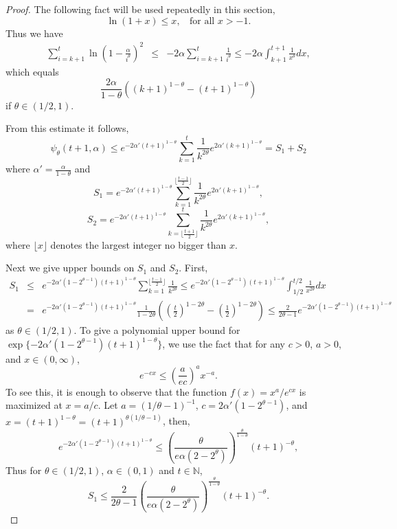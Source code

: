 \documentclass[twoside]{amsart}
\theoremstyle{theorem}
\theoremstyle{definition}
\theoremstyle{remark}
\def\N{{\mathbb N}}
\newcommand{\DS}{\displaystyle}
\begin{document}
\begin{proof}
The following fact will be used repeatedly in this section,
\begin{equation}\label{eq:logubd}
\ln (1+x) \leq x, \ \ \ \ \mbox{for all $x>-1$}.
\end{equation}
Thus we have
\begin{eqnarray*}
\sum_{i=k+1}^t \ln \left( 1-\frac{\alpha}{i^\theta} \right)^2 & \leq &
-2\alpha \sum_{i=k+1}^t \frac{1}{i^\theta} \leq -2\alpha \int_{k+1}^{t+1} \frac{1}{x^\theta} d x,
\end{eqnarray*}
which equals
\[ \frac{2\alpha}{1-\theta} \left((k+1)^{1-\theta}-(t+1)^{1-\theta} \right) \]
if $\theta\in (1/2,1)$.

From this estimate it follows,
\[ \psi_\theta(t+1,\alpha) \leq e^{-2\alpha'(t+1)^{1-\theta}} \sum_{k=1}^{t} \frac{1}{k^{2\theta}}
e^{2\alpha'(k+1)^{1-\theta}} = S_1 + S_2 \]
where $\DS \alpha'=\frac{\alpha}{1-\theta}$ and
\[ S_1 = e^{-2\alpha'(t+1)^{1-\theta}} \sum_{k=1}^{\lfloor\frac{t-1}{2}\rfloor} \frac{1}{k^{2\theta}} e^{2\alpha'(k+1)^{1-\theta}},\]
\[ S_2 = e^{-2\alpha'(t+1)^{1-\theta}} \sum_{k=\lfloor\frac{t+1}{2}\rfloor}^{t} \frac{1}{k^{2\theta}} e^{2\alpha'(k+1)^{1-\theta}},\]
where $\lfloor x \rfloor$ denotes the largest integer no bigger than $x$.

Next we give upper bounds on $S_1$ and $S_2$. First,
\begin{eqnarray*}
S_1 & \leq & e^{-2 \alpha' (1-2^{\theta-1}) (t+1)^{1-\theta}} \sum_{k=1}^{\lfloor\frac{t-1}{2}\rfloor} \frac{1}{k^{2\theta}}
\leq e^{-2 \alpha' (1-2^{\theta-1}) (t+1)^{1-\theta}} \int_{1/2}^{t/2} \frac{1}{x^{2\theta}} d x \\
& = &  e^{-2 \alpha' (1-2^{\theta-1}) (t+1)^{1-\theta} }\frac{1}{1-2\theta} \left(\left(\frac{t}{2}\right)^{1-2\theta}- \left(\frac{1}{2}\right)^{1-2\theta}\right)
\leq  \frac{2}{2 \theta-1} e^{-2 \alpha' (1-2^{\theta-1}) (t+1)^{1-\theta}}
\end{eqnarray*}
as $\theta\in (1/2,1)$. To give a polynomial upper bound for $\exp\{-2 \alpha' (1-2^{\theta-1}) (t+1)^{1-\theta}\}$, we use
the fact that for
any $c>0$, $a>0$, and $x\in (0,\infty)$,
\[ e^{-cx} \leq \left(\frac{a}{ec}\right)^a x^{-a}. \]
To see this, it is enough to observe that the function $f(x)=x^a / e^{cx}$ is maximized at $x=a/c$.
Let $a=(1/\theta-1)^{-1}$, $c= 2 \alpha' (1-2^{\theta-1}) $, and $x=(t+1)^{1-\theta}=(t+1)^{\theta(1/\theta-1)}$,
then,
\[ e^{-2 \alpha' (1-2^{\theta-1}) (t+1)^{1-\theta}} \leq \left(\frac{\theta}{e\alpha(2-2^\theta)}
\right)^{\frac{\theta}{1-\theta}} (t+1)^{-\theta},
\]
Thus for $\theta\in (1/2,1)$, $\alpha\in (0,1)$ and $t\in \N$,
\[ S_1 \leq \frac{2}{2\theta-1} \left(\frac{\theta}{e\alpha(2-2^\theta)}
\right)^{\frac{\theta}{1-\theta}} (t+1)^{-\theta}.\]


\end{proof}
\end{document}
